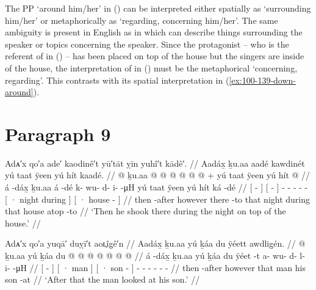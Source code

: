 The PP  ‘around him/her’ in (\lastx) can be interpreted either spatially as ‘surrounding him/her’ or metaphorically as ‘regarding, concerning him/her’.
The same ambiguity is present in English  as in  which can describe things surrounding the speaker or topics concerning the speaker.
Since the protagonist – who is the referent of  in (\lastx) – has been placed on top of the house but the singers are inside of the house, the interpretation of  in (\lastx) must be the metaphorical ‘concerning, regarding’.
This contrasts with its spatial interpretation in (\ref{ex:100-139-down-around}).

\section{Paragraph 9}\label{sec:100-para-9}

\ex\label{ex:100-142-trembling-atop}%
%
\begingl
	\glpreamble	Adᴀ′x qo′a ade′ kaodinê′t yū′tāt ỵīn yuhî′t kādê′. //
	\glpreamble	Aadáx̱ ḵu.aa aadé kawdinét yú taat ÿeen yú hít kaadé. //
	\gla	{}  @ {} {} ḵu.aa 
		{}  @ {} {}
		 @ {} @ {} @ {} @ {} @ {} +
		{} yú taat ÿeen {} 
		{} yú hít  @ {} {} //
	\glb	{} á -dáx̱ {} ḵu.aa
		{} á -dé {} 
		k- wu- d- i-  -μH
		{} yú taat ÿeen {} 
		{} yú hít ká -dé {} //
	\glc	{}[  - {}] 
		{}[  - {}]
		- - - -  -
		{}[ · night during {}]
		{}[ · house  - {}] //
	\gld	{} then -after {} however 
		{} there -to {} 
		 {} {} {} {} {}
		{} that night during {} 
		{} that house atop -to {} //
	\glft	‘Then he shook there during the night on top of the house.’
		//
\endgl
\xe

\ex\label{ex:100-143-look-at-son}%
%
\begingl
	\glpreamble	Adᴀ′x qo′a yuqā′ duỵī′t aoʟ̣îg̣ê′n //
	\glpreamble	Aadáx̱ ḵu.aa yú ḵáa du ÿéett awdlig̱én. //
	\gla	{}  @ {} {} ḵu.aa
		{} yú ḵáa {} 
		{} du  @ {} {} 
		 @ {} @ {} @ {} @ {} @ {} @ {} //
	\glb	{} á -dáx̱ {} ḵu.aa
		{} yú ḵáa {} 
		{} du ÿéet -t {} 
		a- wu- d- l- i-  -μH //
	\glc	{}[  - {}] 
		{}[ · man {}]
		{}[ · son - {}]
		- - - - -  - //
	\gld	{} then -after {} however
		{} that man {}
		{} his son -at {}
		 {} {} {} {} {} {} //
	\glft	‘After that the man looked at his son.’
		//
\endgl
\xe

